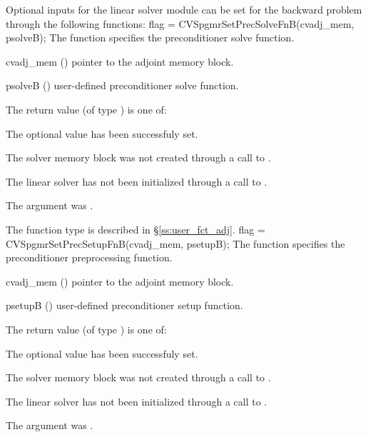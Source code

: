 {}
Optional inputs for the {\cvspgmr} linear solver module can be set for the backward
problem through the following functions:
{
  flag = CVSpgmrSetPrecSolveFnB(cvadj\_mem, psolveB);
}
{
  The function  specifies the preconditioner
  solve function.
}
{
  \begin{args}
  \item[cvadj\_mem] ()
    pointer to the adjoint memory block.
  \item[psolveB] ()
    user-defined preconditioner solve function.
  \end{args}
}
{
  The return value  (of type ) is one of:
  \begin{args}
  \item[\Id{CVSPGMR\_SUCCESS}] 
    The optional value has been successfuly set.
  \item[\Id{CVSPGMR\_MEM\_NULL}]
    The {\cvodes} solver memory block was not created through a call to .
  \item[\Id{CVSPGMR\_LMEM\_NULL}]
    The {\cvspgmr} linear solver has not been initialized through a call to .
  \item[\Id{CV\_ADJMEM\_NULL}]
    The  argument was .
  \end{args}
}
{
   The function type  is described in \S\ref{ss:user_fct_adj}.
}
{
  flag = CVSpgmrSetPrecSetupFnB(cvadj\_mem, psetupB);
}
{
  The function  specifies the preconditioner
  preprocessing function.
}
{
  \begin{args}
  \item[cvadj\_mem] ()
    pointer to the adjoint memory block.
  \item[psetupB] ()
    user-defined preconditioner setup function.
  \end{args}
}
{
  The return value  (of type ) is one of:
  \begin{args}
  \item[\Id{CVSPGMR\_SUCCESS}] 
    The optional value has been successfuly set.
  \item[\Id{CVSPGMR\_MEM\_NULL}]
    The {\cvodes} solver memory block was not created through a call to .
  \item[\Id{CVSPGMR\_LMEM\_NULL}]
    The {\cvspgmr} linear solver has not been initialized through a call to .
  \item[\Id{CV\_ADJMEM\_NULL}]
    The  argument was .
  \end{args}
}
